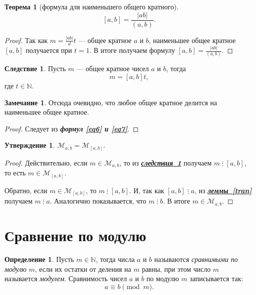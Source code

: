 \documentclass[14pt, a4paper]{extarticle}
\theoremstyle{definition}
\newtheorem{theorem}{Теорема}
\newtheorem*{definition}{Определение}
\newtheorem*{remark}{Замечание}
\newtheorem{corollary}{Следствие}[theorem]
\newtheorem{statement}{Утверждение}
\newcommand{\divisible}{\mathop{\vdots}}
\begin{document}
	\begin{theorem}[формула для наименьшего общего кратного]
		\begin{equation}
		\label{eq7}
			\boxed{[a,b]=\frac{|ab|}{(a,b)}.}
		\end{equation}
	\end{theorem}
	\begin{proof}
		Так как $m=\frac{|ab|}{d}t$ --- общее кратное $a$ и $b$, наименьшее общее кратное $[a,b]$ получается при $t=1$. В итоге получаем формулу $[a,b]=\frac{|ab|}{(a,b)}$.
	\end{proof}

	\begin{corollary}
	\label{krat}
		Пусть $m$ --- общее кратное чисел $a$ и $b$, тогда $$m=[a,b]t,$$ где $t\in\mathbb{N}$.
	\end{corollary}
	\begin{remark}
		Отсюда очевидно, что любое общее кратное делится на наименьшее общее кратное.
	\end{remark}
	\begin{proof}
		Следует из \textbf{\textit{формул \ref{eq6} и \ref{eq7}}}.
	\end{proof}
	
	\begin{statement}
	\label{mnnok}
		$\mathcal{M}_{a,b}=\mathcal{M}_{[a,b]}$.
	\end{statement}
	\begin{proof}
		Действительно, если $m\in\mathcal{M}_{a,b}$, то из \hyperref[krat]{\textbf{\textit{следствия~\ref*{krat}}}} получаем $m\divisible[a,b]$, то есть $m\in\mathcal{M}_{[a,b]}$.
		
		Обратно, если $m\in\mathcal{M}_{[a,b]}$, то $m\divisible[a,b]$. И, так как $[a,b]\divisible a$, из \hyperref[tran]{\textbf{\textit{леммы~\ref*{tran}}}} получаем $m\divisible a$. Аналогично показывается, что $m\divisible b$. В итоге $m\in\mathcal{M}_{a,b}$.
	\end{proof}

\newpage
\section{Сравнение по модулю}
\label{mod}

	\begin{definition}
		Пусть $m\in\mathbb{N}$, тогда числа $a$ и $b$ называются \emph{сравнимыми по модулю} $m$, если их остатки от деления на $m$ равны, при этом число $m$ называется \emph{модулем}. Сравнимость чисел $a$ и $b$ по модулю $m$ записывается так: $$\boxed{a\equiv b\pmod{m}.}$$
	\end{definition}
\end{document}
